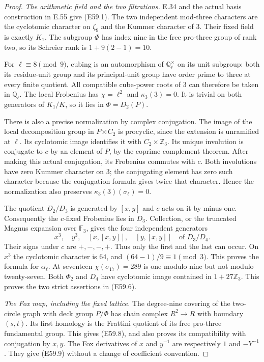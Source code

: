 \begin{proof}
\emph{The arithmetic field and the two filtrations.}
E.34 and the actual basis construction in E.55
give (E59.1). The two independent mod-three
characters are the cyclotomic character on
$\zeta_9$ and the Kummer character of $3$.
Their fixed field is exactly $K_1$.
The subgroup $\Phi$ has index nine in the
free pro-three group of rank two, so its
Schreier rank is $1+9(2-1)=10$.

For $\ell\equiv8\pmod9$, cubing is an
automorphism of $\mathbb Q_\ell^\times$ on
its unit subgroup: both its residue-unit
group and its principal-unit group have
order prime to three at every finite
quotient. All compatible cube-power roots
of $3$ can therefore be taken in
$\mathbb Q_\ell$. The local Frobenius has
$\chi=\ell^2$ and $\kappa_3(3)=0$.
It is trivial on both generators of $K_1/K$,
so it lies in $\Phi=D_2(P)$.

There is also a precise normalization by
complex conjugation. The image of the local
decomposition group in $P\rtimes C_2$ is
procyclic, since the extension is unramified
at $\ell$. Its cyclotomic image identifies
it with $C_2\times\mathbb Z_3$. Its unique
involution is conjugate to $c$ by an element
of $P$, by the coprime complement theorem.
After making this actual conjugation, its
Frobenius commutes with $c$. Both involutions
have zero Kummer character on $3$; the
conjugating element has zero such character
because the conjugation formula gives twice
that character. Hence the normalization also
preserves $\kappa_3(3)(\sigma_\ell)=0$.

The quotient $D_2/D_3$ is generated by
$[x,y]$ and $c$ acts on it by minus one.
Consequently the $c$-fixed Frobenius lies
in $D_3$. Collection, or the truncated
Magnus expansion over $\mathbb F_3$, gives
the four independent generators
\[
 x^3,\quad y^3,\quad[x,[x,y]],\quad[y,[x,y]]
                    \quad\text{of }D_3/D_4.
 \tag{E59.14}
\]
Their signs under $c$ are $+,-,-,+$.
Thus only the first and the last can occur.
On $x^3$ the cyclotomic character is $64$,
and $(64-1)/9\equiv1\pmod3$. This proves
the formula for $\alpha_\ell$.
At seventeen $\chi(\sigma_{17})=289$ is
one modulo nine but not modulo twenty-seven.
Both $\Phi_2$ and $D_4$ have cyclotomic
image contained in $1+27\mathbb Z_3$.
This proves the two strict assertions
in (E59.6).

\emph{The Fox map, including the fixed lattice.}
The degree-nine covering of the two-circle
graph with deck group $P/\Phi$ has chain
complex $R^2\to R$ with boundary $(s,t)$.
Its first homology is the Frattini quotient
of its free pro-three fundamental group.
This gives (E59.8), and also proves its
compatibility with conjugation by $x,y$.
The Fox derivatives of $x$ and $y^{-1}$
are respectively $1$ and $-Y^{-1}$.
They give (E59.9) without a change of
coefficient convention.


\end{proof}
